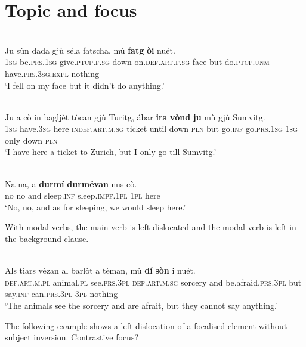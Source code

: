 \section{Topic and focus}

\ea
\label{}
\\
\gll Ju sùn dada gjù séla fatscha, mù \textbf{fatg} \textbf{òi} nuét.\\
\textsc{1sg} be.\textsc{prs.1sg} give.\textsc{ptcp.f.sg} down on.\textsc{def.art.f.sg} face but do.\textsc{ptcp.unm} have.\textsc{prs.3sg.expl} nothing\\
\glt `I fell on my face but it didn't do anything.'
\z

\ea
\label{ex:1:büchli}
\\
\gll  Ju a cò in bagljèt tòcan gjù Turitg, ábar \textbf{ira} \textbf{vònd} \textbf{ju} mù gjù Sumvitg.\\
     \textsc{1sg} have.\textsc{3sg} here \textsc{indef.art.m.sg} ticket until down \textsc{pln} but go.\textsc{inf} go.\textsc{prs}.\textsc{1sg} \textsc{1sg} only down \textsc{pln}\\
\glt `I have here a ticket to Zurich, but I only go till Sumvitg.'
\z

\ea
\label{}
\\
\gll Na na, a \textbf{durmí} \textbf{durmévan} nus cò.\\
no no and sleep.\textsc{inf} sleep.\textsc{impf.1pl} \textsc{1pl} here \\
\glt `No, no, and as for sleeping, we would sleep here.'
\z

With modal verbs, the main verb is left-dislocated and the modal verb is left in the background clause.

\ea\label{}
\\
\gll Als tiars vèzan al barlòt a tèman, mù \textbf{dí} \textbf{sòn} i nuét.\\
     \textsc{def.art.m.pl} animal.\textsc{pl} see.\textsc{prs.3pl} \textsc{def.art.m.sg} sorcery and be.afraid.\textsc{prs.3pl} but say.\textsc{inf} can.\textsc{prs.3pl} \textsc{3pl} nothing\\
\glt `The animals see the sorcery and are afrait, but they cannot say anything.'
\z

The following example shows a left-dislocation of a focalised element without subject inversion. Contrastive focus?

